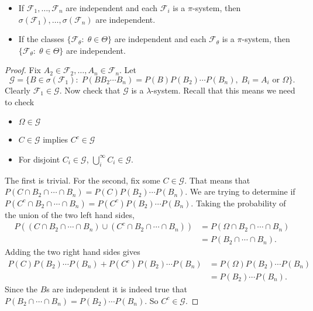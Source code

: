 \documentclass[11pt,fleqn]{book} %
\begin{document}
\begin{theorem} \label{thm:independent-pi-system}
	$ $
	\begin{itemize}
		\item If $\mathcal{F}_1,\dots,\mathcal{F}_n$ are independent and each $\mathcal{F}_i$ is a $\pi$-system, then $\sigma(\mathcal{F}_1),\dots,\sigma(\mathcal{F}_n)$ are independent.
		\item If the classes $\{\mathcal{F}_\theta:\;\theta \in \Theta\}$ are independent and each $\mathcal{F}_\theta$ is a $\pi$-system, then $\{\mathcal{F}_\theta:\;\theta \in \Theta\}$ are independent.
	\end{itemize}
\end{theorem}

\begin{proof}
	Fix $A_2 \in \mathcal{F}_2, \dots, A_n \in \mathcal{F}_n$. Let
	\[
		\mathcal{G} = \{B \in \sigma(\mathcal{F}_1):\;P(B B_2 \cdots B_n) = P(B)P(B_2) \cdots P(B_n),\;B_i=A_i \textrm{ or } \Omega\}.
	\]
	Clearly $\mathcal{F}_1 \in \mathcal{G}$. Now check that $\mathcal{G}$ is a $\lambda$-system. Recall that this means we need to check
	\begin{itemize}
		\item $\Omega \in \mathcal{G}$
		\item $C \in \mathcal{G}$ implies $C^c \in \mathcal{G}$
		\item For disjoint $C_i \in \mathcal{G}$, $\bigcup_i^\infty C_i \in \mathcal{G}$.
	\end{itemize}
	The first is trivial. For the second, fix some $C \in \mathcal{G}$. That means that $P(C \cap B_2 \cap \cdots \cap B_n) = P(C)P(B_2) \cdots P(B_n)$. We are trying to determine if $P(C^c \cap B_2 \cap \cdots \cap B_n) = P(C^c)P(B_2) \cdots P(B_n)$. Taking the probability of the union of the two left hand sides,
	\begin{align*}
		P \left( (C \cap B_2 \cap \cdots \cap B_n) \cup (C^c \cap B_2 \cap \cdots \cap B_n) \right) &= P \left( \Omega \cap B_2 \cap \cdots \cap B_n \right) \\
		&= P(B_2 \cap \cdots \cap B_n).
	\end{align*}
	Adding the two right hand sides gives
	\begin{align*}
		P(C)P(B_2) \cdots P(B_n) + P(C^c)P(B_2) \cdots P(B_n) &= P(\Omega)P(B_2) \cdots P(B_n) \\
		&= P(B_2) \cdots P(B_n).
	\end{align*}
	Since the $B$s are independent it is indeed true that $P(B_2 \cap \cdots \cap B_n) = P(B_2) \cdots P(B_n)$. So $C^c \in \mathcal{G}$.


\end{proof}
\end{document}

